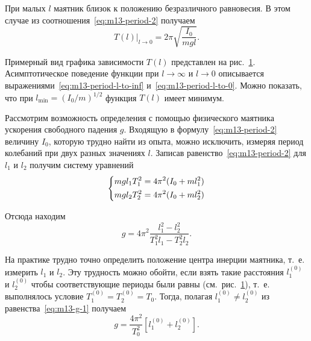 \documentclass[a4paper, 12pt]{extarticle}
\begin{document}
При малых $l$ маятник близок к положению безразличного равновесия. В этом случае из соотношения~\eqref{eq:m13-period-2} получаем
\begin{equation}
\label{eq:m13-period-l-to-0}
\left. T(l) \right|_{l \to 0} = 2 \pi \sqrt{\frac{I_0}{mgl}}.
\end{equation}

Примерный вид графика зависимости $T(l)$ представлен на рис.~\ref{fig:m13-plot}. Асимптотическое поведение функции при $l \to \infty$ и $l \to 0$ описывается выражениями~\eqref{eq:m13-period-l-to-inf} и~\eqref{eq:m13-period-l-to-0}. Можно показать, что при $l_{\min} = (I_0 / m)^{1/2}$ функция $T(l)$ имеет минимум. 

\begin{figure}[h]
\begin{center}
\end{center}
\caption{\label{fig:m13-plot}}
\end{figure}

Рассмотрим возможность определения с помощью физического маятника ускорения свободного падения $g$. Входящую в формулу~\eqref{eq:m13-period-2} величину $I_0$, которую трудно найти из опыта, можно исключить, измеряя период колебаний при двух разных значениях $l$. Записав равенство~\eqref{eq:m13-period-2} для $l_1$ и $l_2$ получим систему уравнений 
\begin{equation}
\label{eq:m13-system}
\left\{ \aligned
m g l_1 T_1^2 = 4 \pi^2 (I_0 + m l_1^2) \\
m g l_2 T_2^2 = 4 \pi^2 (I_0 + m l_2^2)
\endaligned \right.
\end{equation}

Отсюда находим
\begin{equation}
\label{eq:m13-g-1}
g = 4 \pi^2 \frac{l_1^2 - l_2^2}{T_1^2 l_1 - T_2^2 l_2}.
\end{equation}

На практике трудно точно определить положение центра инерции маятника, т.~е. измерить $l_1$ и $l_2$. Эту трудность можно обойти, если взять такие расстояния $l_1^{(0)}$ и $l_2^{(0)}$ чтобы соответствующие периоды были равны (см.~рис.~\ref{fig:m13-plot}), т.~е. выполнялось условие $T_1^{(0)} = T_2^{(0)} = T_0$. Тогда, полагая $l_1^{(0)} \ne l_2^{(0)}$ из равенства~\eqref{eq:m13-g-1} получаем
\begin{equation}
\label{eq:m13-g-2}
g = \frac{4 \pi^2}{T_0^2} \left[ l_1^{(0)} + l_2^{(0)} \right] .
\end{equation}
\end{document}
